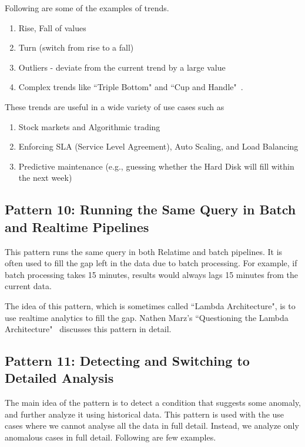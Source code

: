 \documentclass{sig-alternate}
\begin{document}
Following are some of the examples of trends. 

\begin{enumerate}
\item Rise, Fall of values
\item Turn (switch from rise to a fall)
\item Outliers - deviate from the current trend by a large value
\item Complex trends like ``Triple Bottom" and ``Cup and Handle"~\cite{bulkowski2011encyclopedia}.
\end{enumerate}

These trends are useful in a wide variety of use cases such as 

\begin{enumerate}
\item Stock markets and Algorithmic trading 
\item Enforcing SLA (Service Level Agreement), Auto Scaling, and Load Balancing 
\item Predictive maintenance (e.g., guessing whether the Hard Disk will fill within the next week)   
\end{enumerate}

\subsection{Pattern 10: Running the Same Query in Batch and Realtime Pipelines}

This pattern runs the same query in both Relatime and batch pipelines. It is often used to fill the gap left in the data due to batch processing. For example, if batch processing takes 15 minutes, results would always lags 15 minutes from the current data. 

The idea of this pattern, which is sometimes called ``Lambda Architecture", is to use realtime analytics to fill the gap. Nathen Marz's ``Questioning the Lambda Architecture"~\cite{lambdaQ} discusses this pattern in detail.


\subsection{Pattern 11: Detecting and Switching to Detailed Analysis}
The main idea of the pattern is to detect a condition that suggests some anomaly, and further analyze it using historical data.  This pattern is used with the use cases where we cannot analyse all the data in full detail. Instead, we analyze only anomalous cases in full detail. Following are few examples. 
\end{document}
